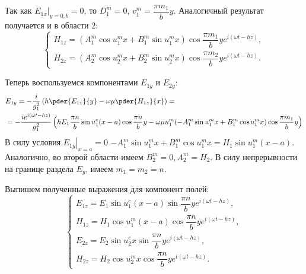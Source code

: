 \documentclass[a4paper]{hedsemwork}
\renewcommand{\frac}{\dfrac}
\begin{document}
Так как \( \left.E_{1x}\right|_{y=0,b} = 0 \), то \( D^m_1 = 0 \),
\( v^m_1 = \frac{\pi m_1}{b} y \). Аналогичный результат получается и в области
2:
\[
    \left\{
    \begin{array}{l}
        H_{1z} =
        (A^m_1\cos u^m_1 x + B^m_1\sin u^m_1 x)\cos\frac{\pi m_1}{b}y
        e^{i(\omega t - h z)}, \\
        H_{2z} =
        (A^m_2\cos u^m_2 x + B^m_2\sin u^m_2 x)\cos\frac{\pi m_2}{b}y
        e^{i(\omega t - h z)}.
    \end{array}
    \right.
\]

Теперь воспользуемся компонентами \( E_{1y} \) и \( E_{2y} \):
\begin{align*}
    & E_{1y} = -\frac{i}{g_1^2}\left( h\pder{E_{1z}}{y} -
    \omega\mu\pder{H_{1z}}{x} \right) = \\
    & = -\frac{ie^{i(\omega t - hz)}}{g_1^2}\left( h E_1 \frac{\pi n}{b}
    \sin u^e_1(x-a)\cos\frac{\pi n}{b}y - \omega\mu
    u^m_1 (-A^m_1 \sin u^m_1 x + B^m_1\cos u^m_1 x)\cos\frac{\pi m_1}{b}y
   \right)
\end{align*}
В силу условия \( \left.E_{1y}\right|_{x=a} = 0 \)
\( -A^m_1 \sin u^m_1 x + B^m_1\cos u^m_1 x = H_1\sin u^m_1(x-a) \).
Аналогично, во второй области имеем \(B^m_2=0, A^m_2 = H_2\).
В силу непрерывности на границе раздела \( E_y \), имеем \( m_1 = m_2 = n \).

Выпишем полученные выражения для компонент полей:
\[
    \left\{
    \begin{array}{l}
        E_{1z} = E_1\sin u^e_1 (x-a) \sin \frac{\pi n}{b}y
        e^{i(\omega t - h z)},\\
        H_{1z} = H_1\cos u^m_1 (x-a) \cos \frac{\pi n}{b}y
        e^{i(\omega t - h z)},\\
        E_{2z} = E_2\sin u^e_2 x \sin \frac{\pi n}{b}y
        e^{i(\omega t - h z)},\\
        H_{2z} = H_2\cos u^m_2 x \cos \frac{\pi n}{b}y
        e^{i(\omega t - h z)}.
    \end{array}
    \right.
\]
\end{document}
